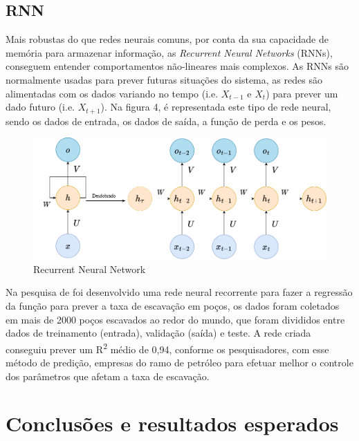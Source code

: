 \documentclass{article}[12pt, openright, oneside, a4paper, portuguese]
\begin{document}
    \subsection{RNN}

    Mais robustas do que redes neurais comuns, por conta da sua capacidade de memória para armazenar informação, as \textit{Recurrent Neural Networks} (RNNs), conseguem entender comportamentos não-lineares mais complexos. As RNNs são normalmente usadas para prever futuras situações do sistema, as redes são alimentadas com os dados variando no tempo (i.e. $X_{t-1}$ e $X_t$) para prever um dado futuro (i.e. $X_{t+1}$). Na figura 4, é representada este tipo de rede neural, sendo  os dados de entrada,  os dados de saída,  a função de perda e  os pesos.

    \begin{figure}[H]
        \centering
        \includegraphics[width=0.75\linewidth]{src/Imagens/RNN DIAGRAMA.drawio.png}
        \caption{Recurrent Neural Network}
    \end{figure}

    Na pesquisa de  foi desenvolvido uma rede neural recorrente para fazer a regressão da função para prever a taxa de escavação em poços, os dados foram coletados em mais de 2000 poços escavados ao redor do mundo, que foram divididos entre dados de treinamento (entrada), validação (saída) e teste. A rede criada conseguiu prever um R\textsuperscript{2} médio de 0,94, conforme os pesquisadores, com esse método de predição, empresas do ramo de petróleo para efetuar melhor o controle dos parâmetros que afetam a taxa de escavação.

\section{Conclusões e resultados esperados}
\end{document}
